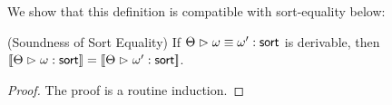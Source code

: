 We show that this definition is compatible with sort-equality below:

\begin{lemma}{(Soundness of Sort Equality)}
If ${\Theta} \vartriangleright {\omega} \equiv {\omega'} : \mathsf{sort}$ is derivable, then
$[\![{{{\Theta}} \vartriangleright {{\omega}} : {\mathsf{sort}}}]\!] = [\![{{{\Theta}} \vartriangleright {{\omega'}} : {\mathsf{sort}}}]\!]$.
\end{lemma}
\begin{proof}
  The proof is a routine induction.
\end{proof}


% 
% 
%  
% 
% 
